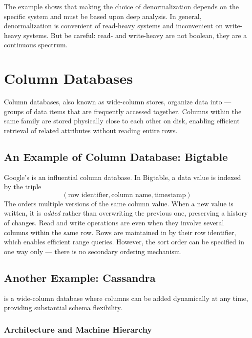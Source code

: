 The example shows that making the choice of denormalization depends on the specific system and must be based upon deep analysis.
In general, denormalization is convenient of read-heavy systems and inconvenient on write-heavy systems.
But be careful: read- and write-heavy are not boolean, they are a continuous spectrum.

\section{Column Databases}

Column databases, also known as wide-column stores, organize data into  --- groups of data items that are frequently accessed together. Columns within the same family are stored physically close to each other on disk, enabling efficient retrieval of related attributes without reading entire rows.

\subsection{An Example of Column Database: Bigtable}

Google's  is an influential column database. In Bigtable, a data value is indexed by the triple
\[
(\text{row identifier}, \text{column name}, \text{timestamp})
\]
The  orders multiple versions of the same column value. When a new value is written, it is \emph{added} rather than overwriting the previous one, preserving a history of changes. Read and write operations are  even when they involve several columns within the same row. Rows are maintained in  by their row identifier, which enables efficient range queries. However, the sort order can be specified in one way only --- there is no secondary ordering mechanism.

\subsection{Another Example: Cassandra}

 is a wide-column database where columns can be added dynamically at any time, providing substantial schema flexibility.

\subsubsection{Architecture and Machine Hierarchy}

